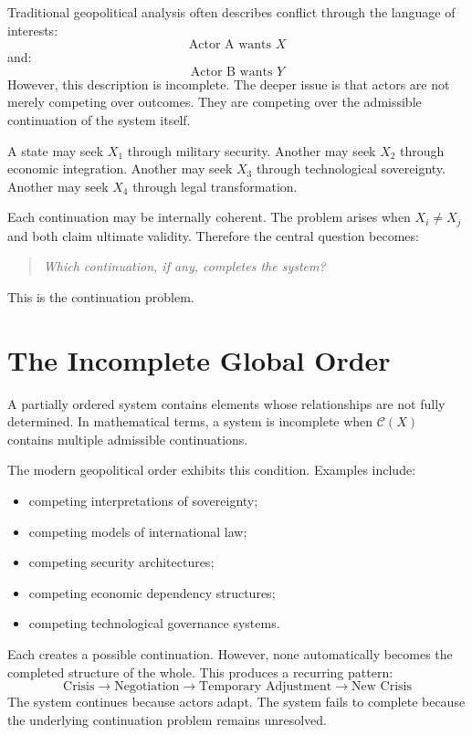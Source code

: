 \documentclass[11pt,openany]{book}
\theoremstyle{plain}
\theoremstyle{definition}
\begin{document}
Traditional geopolitical analysis often describes conflict through the language of interests:
\[
\text{Actor A wants } X
\]
and:
\[
\text{Actor B wants } Y
\]
However, this description is incomplete. The deeper issue is that actors are not merely competing over outcomes. They are competing over the admissible continuation of the system itself.

A state may seek \(X_1\) through military security. Another may seek \(X_2\) through economic integration. Another may seek \(X_3\) through technological sovereignty. Another may seek \(X_4\) through legal transformation.

Each continuation may be internally coherent. The problem arises when \(X_i \neq X_j\) and both claim ultimate validity. Therefore the central question becomes:
\begin{quote}
\textit{Which continuation, if any, completes the system?}
\end{quote}
This is the continuation problem.

\section{The Incomplete Global Order}

A partially ordered system contains elements whose relationships are not fully determined. In mathematical terms, a system is incomplete when \(\mathcal{C}(X)\) contains multiple admissible continuations.

The modern geopolitical order exhibits this condition. Examples include:
\begin{itemize}
\item competing interpretations of sovereignty;
\item competing models of international law;
\item competing security architectures;
\item competing economic dependency structures;
\item competing technological governance systems.
\end{itemize}

Each creates a possible continuation. However, none automatically becomes the completed structure of the whole. This produces a recurring pattern:
\[
\text{Crisis} \longrightarrow \text{Negotiation} \longrightarrow \text{Temporary Adjustment} \longrightarrow \text{New Crisis}
\]
The system continues because actors adapt. The system fails to complete because the underlying continuation problem remains unresolved.
\end{document}
